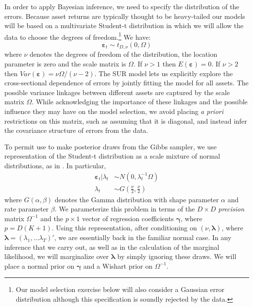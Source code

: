 In order to apply Bayesian inference, we need to specify the distribution of the errors. 
Because asset returns are typically thought to be heavy-tailed our models will be based on a multivariate Student-t distribution in which we will allow the data to choose the degrees of freedom.\footnote{Our model selection exercise below will also consider a Gaussian error distribution although this specification is soundly rejected by the data.}
We have:
\begin{equation*}
\boldsymbol{\varepsilon}_{t}\sim t_{D,\nu }\left( 0,\Omega \right)
\end{equation*}
where $\nu$ denotes the degrees of freedom of the distribution, the location parameter is zero and the scale matrix is $\Omega$.
If $\nu >1$ then $E(\boldsymbol{\varepsilon}) = 0$. 
If $\nu>2$ then $Var\left( \boldsymbol{\varepsilon} \right) = \nu \Omega/(\nu-2)$. 
The SUR model lets us explicitly explore the cross-sectional dependence of errors by jointly fitting the model for all assets. 
The possible variance linkages between different assets are captured by the scale matrix $\Omega$. 
While acknowledging the importance of these linkages and the possible influence they may have on the model selection, we avoid placing \emph{a priori} restrictions on this matrix, such as assuming that it is diagonal, and instead infer the covariance structure of errors from the data.

To permit use to make posterior draws from the Gibbs sampler, we use representation of the Student-t distribution as a scale mixture of normal distributions, as in \cite{chib1995hierarchical}.
In particular,
\begin{align*}
\boldsymbol{\varepsilon}_{t}|\lambda _{t} &\sim N\left( 0,\lambda _{t}^{-1}\Omega \right)
\\
\lambda _{t} &\sim G\left( \frac{\nu }{2},\frac{\nu }{2}\right)
\end{align*}
where $G(\alpha,\beta)$ denotes the Gamma distribution with shape parameter $\alpha$ and rate parameter $\beta$. 
We parameterize this problem in terms of the $D\times D$ \emph{precision} matrix $\Omega^{-1}$ and the $p\times1$ vector of regression coefficients $\boldsymbol{\gamma}$, where $p = D(K+1)$. 
Using this representation, after conditioning on $\left( \nu, \boldsymbol{\lambda} \right)$, where $\boldsymbol{\lambda} = (\lambda_1, \dots \lambda_T)'$, we are essentially back in the familiar normal case.
In any inference that we carry out, as well as in the calculation of the marginal likelihood, we will marginalize over $\boldsymbol{\lambda}$ by simply ignoring these draws.
We will place a normal prior on $\boldsymbol{\gamma}$ and a Wishart prior on $\Omega^{-1}$. 

